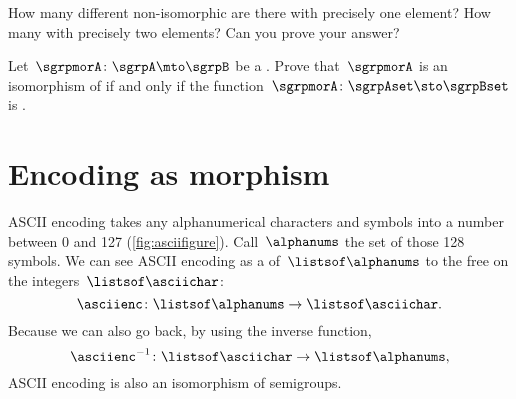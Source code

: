 
\begin{gradedexercise}
    \label{ex:non-isomorphic}
    How many different non-isomorphic  are there with precisely one element?
    How many with precisely two elements?
    Can you prove your answer?
\end{gradedexercise}

\begin{gradedexercise}
    \label{ex:CharacterizeSemigroupIsos}
    \label{ex:semi-morph}
    Let~$\sgrpmorA\colon \sgrpA \mto \sgrpB$ be a .
    Prove that~$\sgrpmorA$ is an isomorphism of  if and only if the function~$\sgrpmorA \colon \sgrpAset \sto \sgrpBset$ is .
\end{gradedexercise}

\section{Encoding as morphism }

\begin{example}
    ASCII encoding takes any alphanumerical characters and symbols into a number between 0 and 127 (\cref{fig:asciifigure}).
    Call~$\alphanums$ the set of those 128 symbols.
    We can see ASCII encoding as a  of~$\listsof\alphanums$ to the free  on the integers~$\listsof\asciichar$:
    \begin{equation}
        \label{eq:ASCII-semi}
        \asciienc\colon \listsof\alphanums \to  \listsof\asciichar.
    \end{equation}
    Because we can also go back, by using the inverse function,
    \begin{equation}
        \label{eq:ASCII-semi-inv}
        \asciienc^{-1}\colon  \listsof\asciichar  \to  \listsof\alphanums,
    \end{equation}
    ASCII encoding is also an isomorphism of semigroups.
\end{example}

